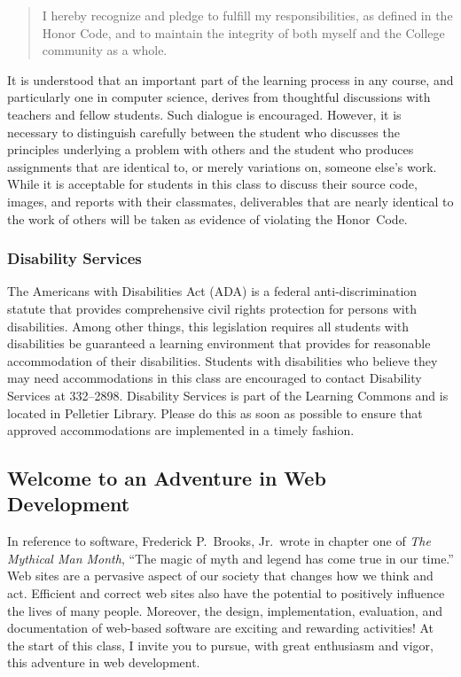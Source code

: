 \documentclass[11pt]{article}
\begin{document}
\vspace*{-.05in}
%
\begin{quote}
%
  I hereby recognize and pledge to fulfill my responsibilities, as defined in
  the Honor Code, and to maintain the integrity of both myself and the College
  community as a whole.
%
\end{quote}
%
\vspace*{-.075in}

\noindent It is understood that an important part of the learning process in any
course, and particularly one in computer science, derives from thoughtful
discussions with teachers and fellow students. Such dialogue is encouraged.
However, it is necessary to distinguish carefully between the student who
discusses the principles underlying a problem with others and the student who
produces assignments that are identical to, or merely variations on, someone
else's work. While it is acceptable for students in this class to discuss their
source code, images, and reports with their classmates, deliverables that are
nearly identical to the work of others will be taken as evidence of violating
the \mbox{Honor Code}.

\vspace*{-.1in}

\subsubsection*{Disability Services}

The Americans with Disabilities Act (ADA) is a federal anti-discrimination
statute that provides comprehensive civil rights protection for persons with
disabilities. Among other things, this legislation requires all students with
disabilities be guaranteed a learning environment that provides for reasonable
accommodation of their disabilities. Students with disabilities who believe they
may need accommodations in this class are encouraged to contact Disability
Services at 332--2898. Disability Services is part of the Learning Commons and
is located in Pelletier Library. Please do this as soon as possible to ensure
that approved accommodations are implemented in a timely fashion.

\vspace*{-.05in}

\subsection*{Welcome to an Adventure in Web Development}

In reference to software, Frederick P.\ Brooks, Jr.\ wrote in chapter one of
{\em The Mythical Man Month}, ``The magic of myth and legend has come true in
our time.'' Web sites are a pervasive aspect of our society that changes how we
think and act. Efficient and correct web sites also have the potential to
positively influence the lives of many people. Moreover, the design,
implementation, evaluation, and documentation of web-based software are exciting
and rewarding activities! At the start of this class, I invite you to pursue,
with great enthusiasm and vigor, this adventure in web development.
\end{document}

